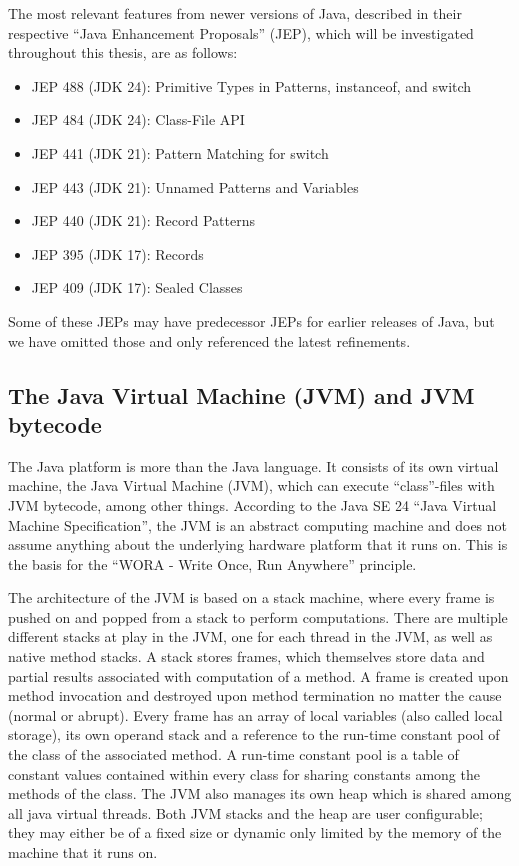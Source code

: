 The most relevant features from newer versions of Java, described in their respective ``Java Enhancement Proposals'' (JEP),
which will be investigated throughout this thesis, are as follows:

\begin{itemize}
    \item JEP 488 (JDK 24)\cite{jep488}: Primitive Types in Patterns, instanceof, and switch
    \item JEP 484 (JDK 24)\cite{jep484}: Class-File API
    \item JEP 441 (JDK 21)\cite{jep441}: Pattern Matching for switch
    \item JEP 443 (JDK 21)\cite{jep443}: Unnamed Patterns and Variables
    \item JEP 440 (JDK 21)\cite{jep440}: Record Patterns
    \item JEP 395 (JDK 17)\cite{jep395}: Records
    \item JEP 409 (JDK 17)\cite{jep409}: Sealed Classes
\end{itemize}

Some of these JEPs may have predecessor JEPs for earlier releases of Java, but we have omitted those and only referenced the latest refinements. 

\subsection{The Java Virtual Machine (JVM) and JVM bytecode}

The Java platform is more than the Java language. It consists of its own virtual machine,
the Java Virtual Machine (JVM), which can execute ``class''-files with JVM bytecode, among other things.
According to the Java SE 24 ``Java Virtual Machine Specification''\cite{jvm_spec}, the JVM is an abstract computing machine
and does not assume anything about the underlying hardware platform that it runs on. This is the basis for the
``WORA - Write Once, Run Anywhere'' principle.

The architecture of the JVM is based on a stack machine, where every frame is pushed on and popped from
a stack to perform computations. There are multiple different stacks at play in the JVM, one for each
thread in the JVM, as well as native method stacks. A stack stores frames, which themselves store data
and partial results associated with computation of a method. A frame is created upon method invocation
and destroyed upon method termination no matter the cause (normal or abrupt). Every frame has an array
of local variables (also called local storage), its own operand stack and a reference to the run-time
constant pool of the class of the associated method. A run-time constant pool is a table of constant
values contained within every class for sharing constants among the methods of the class. The JVM
also manages its own heap which is shared among all java virtual threads. Both JVM stacks and the heap
are user configurable; they may either be of a fixed size or dynamic only limited by the memory of
the machine that it runs on.

